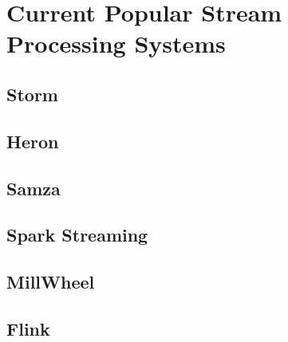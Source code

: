 \section{Current Popular Stream Processing Systems}

	
	
\subsection{Storm}
\subsection{Heron}
\subsection{Samza}
\subsection{Spark Streaming}
\subsection{MillWheel}
\subsection{Flink}

